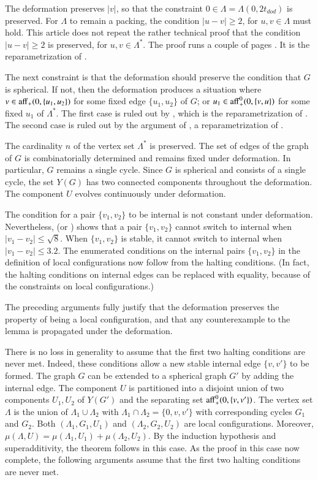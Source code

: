 The deformation preserves $|v|$,
so that the constraint $0\in\Lambda=\Lambda(0,2t_{dod})$ is preserved.
For $\Lambda$ to remain a packing,  the condition
 $|u-v|\ge 2$, for $u,v\in \Lambda$ must hold.
This article does not repeat the rather technical proof that
the condition
 $|u-v|\ge 2$ is preserved, for $u,v\in\Lambda^*$.  The proof
runs a couple  of pages \cite[Lemma~7.6]{arx}.
It is the reparametrization of \cite[Lemma~12.20]{DCG}.

The next constraint is that the deformation should preserve the condition
that $G$ is spherical.  
If not, then the deformation produces
a situation where $v\in {\operatorname{aff}}_+(0,\{u_1,u_2\})$ for some fixed edge $\{u_1,u_2\}$
of $G$; or $u_1\in {\operatorname{aff}}_+^0(0,\{v,u\})$ for some fixed $u_1$ of $\Lambda^*$.
The first case is ruled out by \cite[Remark~p.22]{arx}, which is the reparametrization of \cite[\S12.7,p.132]{DCG}.  The second case is ruled out by 
the argument of \cite[p.27]{arx}, a reparametrization of 
\cite[\S12.8,p.134]{DCG}.

The cardinality $n$ of the vertex set $\Lambda^*$ is preserved.
The set of edges of the graph of $G$ is combinatorially determined and
remains fixed under deformation.  In particular, $G$ remains a single
cycle.  Since $G$ is spherical and consists of a single
cycle, the set $Y(G)$ has two connected components throughout the
deformation.  The component $U$ evolves continuously under deformation.   

The condition for a pair $\{v_1,v_2\}$ to be
internal is not constant under deformation.  Nevertheless,
\cite[p.23]{arx} (or \cite[p.132]{DCG}) 
shows that a pair $\{v_1,v_2\}$
cannot switch to internal when $|v_1-v_2| \le \sqrt8$.  When $\{v_1,v_2\}$ is stable,
it cannot switch to internal when $|v_1-v_2|\le 3.2$. 
The enumerated conditions on the
internal pairs $\{v_1,v_2\}$ in the definition of local configurations
now follow from the halting conditions. (In fact, the halting conditions on internal edges
can be replaced with equality, because of the
constraints on local configurations.)

The preceding arguments fully justify that the deformation preserves
the property of being a local configuration, and that
any counterexample to the lemma is propagated under
the deformation.


There is no loss in generality to assume that the first two halting conditions are never
met.  Indeed, these conditions allow a new stable internal edge $\{v,v'\}$ to be formed.  The
graph $G$ can be extended to a spherical graph $G'$ by adding the internal edge.
The component $U$ is partitioned into a disjoint union of two components $U_1,U_2$ 
of $Y(G')$ and the separating set ${\operatorname{aff}}_+^0(0,\{v,v'\})$.  The vertex set
$\Lambda$ is the union of $\Lambda_1\cup\Lambda_2$ with $\Lambda_1\cap\Lambda_2=\{0,v,v'\}$
with corresponding cycles $G_1$ and $G_2$.  Both $(\Lambda_1,G_1,U_1)$ and $(\Lambda_2,G_2,U_2)$ are local configurations.  Moreover, $\mu(\Lambda,U) = \mu(\Lambda_1,U_1)+\mu(\Lambda_2,U_2)$.  By the induction hypothesis and superadditivity, the theorem follows in this case.
As the proof in this case now complete, the following arguments
assume that the first two halting conditions are never met.

